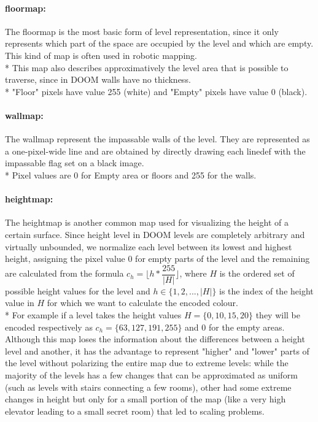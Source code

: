 \paragraph{\gls{floormap}:} The \gls{floormap} is the most basic form of level representation, since it only represents which part of the space are occupied by the level and which are empty. This kind of map is often used in robotic mapping. \\*
This map also describes approximatively the level area that is possible to traverse, since in DOOM walls have no thickness. \\*
"Floor" pixels have value 255 (white) and "Empty" pixels have value 0 (black).

\paragraph{\gls{wallmap}:} The \gls{wallmap} represent the impassable walls of the level. They are represented as a one-pixel-wide line and are obtained by directly drawing each \gls{linedef} with the impassable flag set on a black image. \\*
Pixel values are 0 for Empty area or floors and 255 for the walls.

\paragraph{\gls{heightmap}:} The \gls{heightmap} is another common map used for visualizing the height of a certain surface. Since height level in DOOM levels are completely arbitrary and virtually unbounded, we normalize each level between its lowest and highest height, assigning the pixel value 0 for empty parts of the level and the remaining are calculated from the formula $ c_{h} = \lfloor h * \dfrac{255}{|H|} \rfloor $, where $ H $ is the ordered set of possible height values for the level and $ h \in \{1, 2, ..., |H| \} $ is the index of the height value in $ H $ for which we want to calculate the encoded colour. \\*
 For example if a level takes the height values $ H = \{ 0, 10, 15, 20 \} $ they will be encoded respectively as $ c_{h} = \{ 63, 127, 191, 255\} $ and 0 for the empty areas. Although this map loses the information about the differences between a height level and another, it has the advantage to represent "higher" and "lower" parts of the level without polarizing the entire map due to extreme levels: while the majority of the levels has a few changes that can be approximated as uniform (such as levels with stairs connecting a few rooms), other had some extreme changes in height but only for a small portion of the map (like a very high elevator leading to a small secret room) that led to scaling problems.
 
